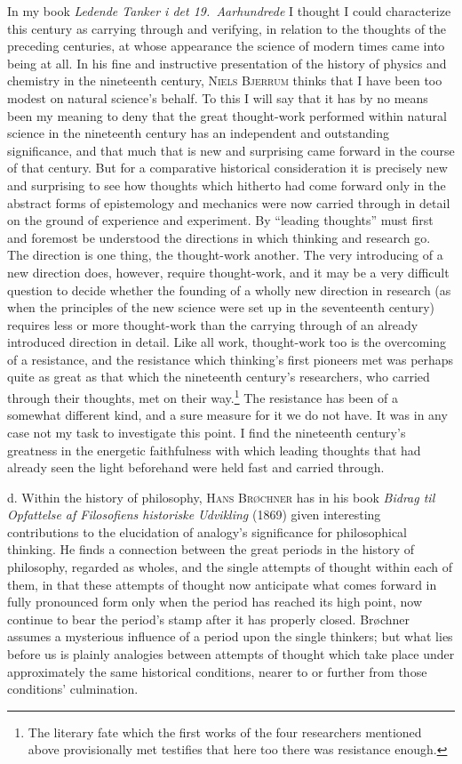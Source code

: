 \documentclass[12pt]{book}
\newcommand{\opage}[1]{\marginnote{\footnotesize\textit{[#1]}}}
\begin{document}
In my book \textit{Ledende Tanker i det 19.\ Aarhundrede} I thought I could
characterize this century as carrying through and verifying, in relation to the
thoughts of the preceding centuries, at whose appearance the science of modern
times came into being at all. In his fine and instructive presentation of the
history of physics and chemistry in the nineteenth century, \textsc{Niels
Bjerrum} thinks that I have been too modest on natural science's behalf. To this
I will say that it has by no means been my meaning to deny that the great
thought-work performed within natural science in the nineteenth century has an
independent and outstanding significance, and that much that is new and
surprising came forward in the course of that century. But for a comparative
historical consideration it is precisely new and surprising to see how thoughts
which hitherto had come forward only in the abstract forms of epistemology and
mechanics were now carried through in detail on the ground of experience and
experiment. By ``leading thoughts'' must first and foremost be understood the
directions in which thinking and research go. The direction is one thing, the
thought-work another. The very introducing of a new direction does, however,
require thought-work, and it may be a very difficult question to decide whether
the founding of a wholly new direction in research (as when the principles of the
new science were set up in the seventeenth century) requires \opage{78}less or more
thought-work than the carrying through of an already introduced direction in
detail. Like all work, thought-work too is the overcoming of a resistance, and
the resistance which thinking's first pioneers met was perhaps quite as great as
that which the nineteenth century's researchers, who carried through their
thoughts, met on their way.\footnote{The literary fate which the first works of
the four researchers mentioned above provisionally met testifies that here too
there was resistance enough.} The resistance has been of a somewhat different
kind, and a sure measure for it we do not have. It was in any case not my task to
investigate this point. I find the nineteenth century's greatness in the
energetic faithfulness with which leading thoughts that had already seen the
light beforehand were held fast and carried through.

d. Within the history of philosophy, \textsc{Hans Brøchner} has in his book
\textit{Bidrag til Opfattelse af Filosofiens historiske Udvikling} (1869) given
interesting contributions to the elucidation of analogy's significance for
philosophical thinking. He finds a connection between the great periods in the
history of philosophy, regarded as wholes, and the single attempts of thought
within each of them, in that these attempts of thought now anticipate what comes
forward in fully pronounced form only when the period has reached its high point,
now continue to bear the period's stamp after it has properly closed. Brøchner
assumes a mysterious influence of a period upon the single thinkers; but what
lies before us is plainly analogies between attempts of thought which take place
under approximately the same historical conditions, nearer to or further from
those conditions' culmination.
\end{document}
